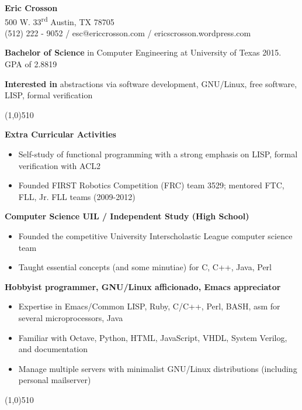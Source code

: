 \documentclass{report}
\newcommand{\cut}{\begin{center} \line(1,0){510} \end{center}}
\begin{document}
\pagestyle{empty}
\setlength\parindent{0pt}

\begin{center}
  \textbf{Eric Crosson} \\
  500 W. 33\textsuperscript{rd} Austin, TX 78705 \\
  (512) 222 - 9052 / esc@ericcrosson.com / ericscrosson.wordpress.com
\end{center}

\textbf{Bachelor of Science} in Computer Engineering at
University of Texas 2015. GPA of 2.8819

\textbf{Interested in} abstractions via software development, GNU/Linux, free software, LISP, formal verification

\cut{}

\textbf{Extra Curricular Activities}
\begin{itemize}
  \renewcommand{\labelitemi}{$\circ$}
\item Self-study of functional programming with a strong emphasis on LISP, formal verification with ACL2
\item Founded FIRST Robotics Competition (FRC) team 3529; mentored FTC, FLL, Jr. FLL teams (2009-2012)
\end{itemize}

\textbf{Computer Science UIL / Independent Study (High School)}
\begin{itemize}
  \renewcommand{\labelitemi}{$\circ$}
\item Founded the competitive University Interscholastic League computer science team
\item Taught essential concepts (and some minutiae) for C, C++, Java, Perl
\end{itemize}

\textbf{Hobbyist programmer, GNU/Linux afficionado, Emacs appreciator}
\begin{itemize}
  \renewcommand{\labelitemi}{$\circ$}
\item Expertise in Emacs/Common LISP, Ruby, C/C++, Perl, BASH, asm for several microprocessors, Java
\item Familiar with Octave, Python, HTML, JavaScript, VHDL, System Verilog, and documentation
\item Manage multiple servers with minimalist GNU/Linux distributions (including personal mailserver)
\end{itemize}

\cut{}
\end{document}
